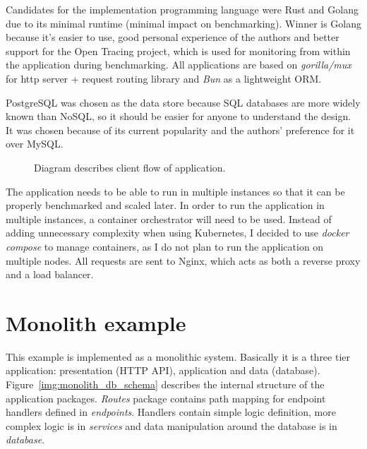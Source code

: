 Candidates for the implementation programming language were Rust and Golang due to its minimal runtime (minimal impact on benchmarking). Winner is Golang because it's easier to use, good personal experience of the authors and better support for the Open Tracing project, which is used for monitoring from within the application during benchmarking. All applications are based on \textit{gorilla/mux} \cite{MUX} for http server + request routing library and \textit{Bun} \cite{BUN} as a lightweight ORM.

PostgreSQL was chosen as the data store because SQL databases are more widely known than NoSQL, so it should be easier for anyone to understand the design. It was chosen because of its current popularity and the authors' preference for it over MySQL.
\begin{figure}
    \centering
    
    \caption{Diagram describes client flow of application. \label{img:app_activity_flow}}
\end{figure}

The application needs to be able to run in multiple instances so that it can be properly benchmarked and scaled later. In order to run the application in multiple instances, a container orchestrator will need to be used. Instead of adding unnecessary complexity when using Kubernetes, I decided to use \textit{docker compose} to manage containers, as I do not plan to run the application on multiple nodes. All requests are sent to Nginx, which acts as both a reverse proxy and a load balancer.


\section{Monolith example}
This example is implemented as a monolithic system. Basically it is a three tier application: presentation (HTTP API), application and data (database). Figure~\ref{img:monolith_db_schema} describes the internal structure of the application packages. \textit{Routes} package contains path mapping for endpoint handlers defined in \textit{endpoints}. Handlers contain simple logic definition, more complex logic is in \textit{services} and data manipulation around the database is in \textit{database}.

%     


